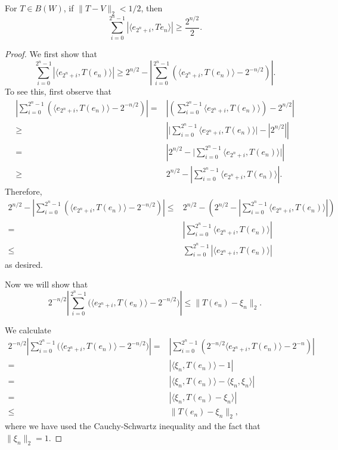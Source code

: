 \documentclass[12pt]{article}
\begin{document}

\begin{proposition}
\label{prop_ineq}
	For $T\in B(W)$, if $\|T-V\|_2<1/2$, then 
	\[
		\sum_{i=0}^{2^n-1} | \langle e_{2^n+i},Te_n\rangle | \geq \frac{2^{n/2}}{2}.
	\]
\end{proposition}
\begin{proof}
	We first show that 
	\begin{equation*}
		\sum_{i=0}^{2^n-1}|\langle e_{2^n+i}, T(e_n)\rangle|
		\geq 2^{n/2} - \left| \sum_{i=0}^{2^n-1} \left( \langle e_{2^n+i},T(e_n)\rangle - 2^{-n/2} \right) \right|.
	\end{equation*}
	To see this, first observe that
	\begin{align*}
		\left| \sum_{i=0}^{2^n-1} \left( \langle e_{2^n+i},T(e_n)\rangle - 2^{-n/2} \right) \right|
		=& \left| \left( \sum_{i=0}^{2^n-1} \langle e_{2^n+i},T(e_n) \rangle \right) - 2^{n/2} \right| \\
		\geq& \left| \big| \sum_{i=0}^{2^n-1} \langle e_{2^n+i}, T(e_n) \rangle \big| - |2^{n/2}| \right| \\
		=& \left| 2^{n/2} - \big| \sum_{i=0}^{2^n-1} \langle e_{2^n+i}, T(e_n) \rangle \big| \right| \\
		\geq&  2^{n/2} - \left| \sum_{i=0}^{2^n-1} \langle e_{2^n+i}, T(e_n) \rangle \right|.
	\end{align*}
	Therefore,
	\begin{align*}
		2^{n/2} - \left| \sum_{i=0}^{2^n-1} \left( \langle e_{2^n+i},T(e_n) \rangle - 2^{-n/2} \right) \right| 
		\leq& 2^{n/2} - \left( 2^{n/2} - \left| \sum_{i=0}^{2^n-1} \langle e_{2^n+i}, T(e_n) \rangle \right| \right) \\
		=& \left| \sum_{i=0}^{2^n-1} \langle e_{2^n+i}, T(e_n) \rangle \right| \\
		\leq& \sum_{i=0}^{2^n-1}|\langle e_{2^n+i},T(e_n)\rangle|
	\end{align*}
	as desired.

	Now we will show that
	\begin{equation*}
		2^{-n/2} \left| \sum_{i=0}^{2^n-1} \big( \langle e_{2^n+i},T(e_n)\rangle - 2^{-n/2} \big) \right|
		\leq \|T(e_n)-\xi_n\|_2.
	\end{equation*}

	We calculate 
	\begin{align*}
		2^{-n/2} \left| \sum_{i=0}^{2^n-1} \big( \langle e_{2^n+i},T(e_n)\rangle - 2^{-n/2} \big) \right|
		=& \left|\sum_{i=0}^{2^n-1}\left( 2^{-n/2}\langle e_{2^n+i},T(e_n)\rangle - 2^{-n} \right) \right| \\
		=& |\langle \xi_n,T(e_n) \rangle -1| \\
		=& |\langle\xi_n,T(e_n)\rangle - \langle\xi_n,\xi_n\rangle| \\
		=& |\langle\xi_n, T(e_n)-\xi_n\rangle| \\
		\leq& \|T(e_n)-\xi_n\|_2,
	\end{align*}	
	where we have used the Cauchy-Schwartz inequality and the fact that $\|\xi_n\|_2=1$.


\end{proof}
\end{document}
